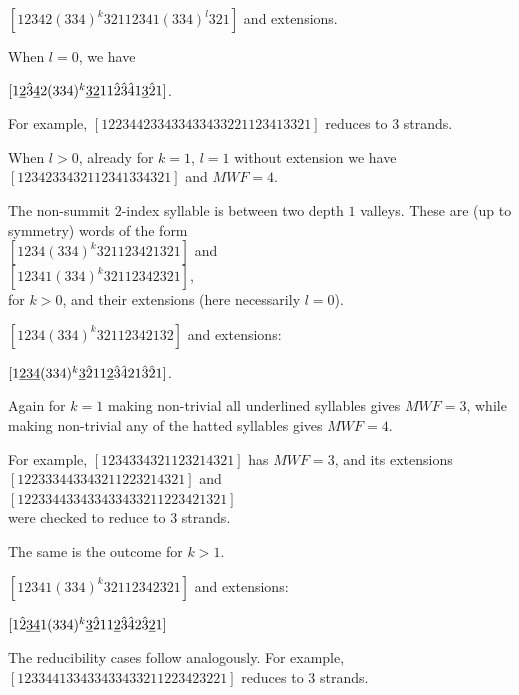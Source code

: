 \begin{caselist}
\begin{caselist}
\begin{caselist}
\case $[12342(334)^k32112341(334)^l321]$ and extensions.

\begin{caselist}
\case When $l=0$, we have

$[1\underline 2\hat 3\underline 42(334)^k\underline 3\underline 211\hat 2\hat 3\hat 41\underline 3\hat 21]$.

For example, $[122344233433433433221123413321]$ reduces to 3 strands.

\case When $l>0$, already for $k=1$, $l=1$ without extension
we have $[1234233432112341334321]$ and $MWF=4$.
\end{caselist}
\end{caselist}

\case The non-summit $2$-index syllable is between
two depth $1$ valleys. These are (up to symmetry) words of the form\\
$[1234(334)^k321123421321]$ and \\
$[12341(334)^k32112342321]$, \\
for $k>0$, and their extensions (here necessarily $l=0$).

\begin{caselist}
\case $[1234(334)^k32112342132]$ and extensions:

$[1\underline 2\underline 3\underline 4(334)^k\underline 3\hat 211\underline 2\hat 3\hat 421\hat 3\hat 21]$.

Again for $k=1$ making non-trivial all underlined syllables 
gives $MWF=3$, while making non-trivial any of the hatted
syllables gives $MWF=4$. 

For example,
$[12 3  4 3343       2112 3 214321]$ has $MWF=3$, and its extensions\\
$[122333443343       211223 214321]$ and \\
$[12233 4433433433433211223421 321]$ \\
were checked to reduce to 3 strands.

The same is the outcome for $k>1$.

\case $[12341(334)^k32112342321]$ and extensions:

$[1\hat 2\underline{34}1(334)^k\underline 3\hat 211\underline 2\hat 3\hat 42\hat 3\underline 21]$

The reducibility cases follow analogously. %
For example, $[123344133433433433211223423221]$ reduces to 3 strands.


\end{caselist}

\end{caselist}
\end{caselist}

